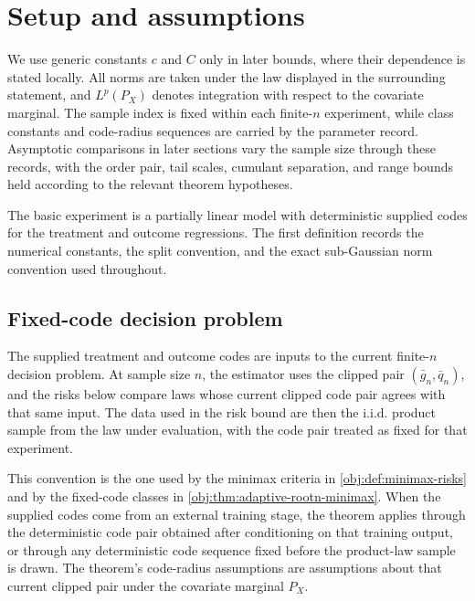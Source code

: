 \section{Setup and assumptions}

We use generic constants \(c\) and \(C\) only in later bounds, where their dependence is stated locally. All norms are taken under the law displayed in the surrounding statement, and \(L^p(P_X)\) denotes integration with respect to the covariate marginal. The sample index is fixed within each finite-\(n\) experiment, while class constants and code-radius sequences are carried by the parameter record. Asymptotic comparisons in later sections vary the sample size through these records, with the order pair, tail scales, cumulant separation, and range bounds held according to the relevant theorem hypotheses.

The basic experiment is a partially linear model with deterministic supplied codes for the treatment and outcome regressions. The first definition records the numerical constants, the split convention, and the exact sub-Gaussian norm convention used throughout.

\subsection{Fixed-code decision problem}

The supplied treatment and outcome codes are inputs to the current finite-\(n\) decision problem. At sample size \(n\), the estimator uses the clipped pair \((\bar g_n,\bar q_n)\), and the risks below compare laws whose current clipped code pair agrees with that same input. The data used in the risk bound are then the i.i.d. product sample from the law under evaluation, with the code pair treated as fixed for that experiment.

This convention is the one used by the minimax criteria in \cref{obj:def:minimax-risks} and by the fixed-code classes in \cref{obj:thm:adaptive-rootn-minimax}. When the supplied codes come from an external training stage, the theorem applies through the deterministic code pair obtained after conditioning on that training output, or through any deterministic code sequence fixed before the product-law sample is drawn. The theorem's code-radius assumptions are assumptions about that current clipped pair under the covariate marginal \(P_X\).

